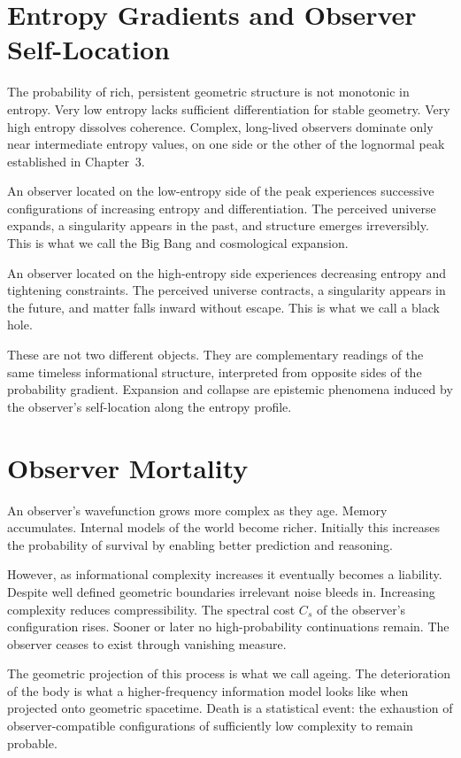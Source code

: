 \section{Entropy Gradients and Observer Self-Location}

The probability of rich, persistent geometric structure is not monotonic
in entropy. Very low entropy lacks sufficient differentiation for stable
geometry. Very high entropy dissolves coherence. Complex, long-lived
observers dominate only near intermediate entropy values, on one side or
the other of the lognormal peak established in Chapter~3.

An observer located on the low-entropy side of the peak experiences
successive configurations of increasing entropy and differentiation. The
perceived universe expands, a singularity appears in the past, and
structure emerges irreversibly. This is what we call the Big Bang and
cosmological expansion.

An observer located on the high-entropy side experiences decreasing
entropy and tightening constraints. The perceived universe contracts, a
singularity appears in the future, and matter falls inward without
escape. This is what we call a black hole.

These are not two different objects. They are complementary readings of
the same timeless informational structure, interpreted from opposite
sides of the probability gradient. Expansion and collapse are epistemic
phenomena induced by the observer's self-location along the entropy
profile.


\section{Observer Mortality}

An observer's wavefunction grows more complex as they age. Memory
accumulates. Internal models of the world become richer. Initially this
increases the probability of survival by enabling better prediction and
reasoning.

However, as informational complexity increases it eventually becomes a
liability. Despite well defined geometric boundaries irrelevant noise
bleeds in. Increasing complexity reduces compressibility. The spectral
cost $C_s$ of the observer's configuration rises. Sooner or later no
high-probability continuations remain. The observer ceases to exist
through vanishing measure.

The geometric projection of this process is what we call ageing. The
deterioration of the body is what a higher-frequency information model
looks like when projected onto geometric spacetime. Death is a
statistical event: the exhaustion of observer-compatible configurations
of sufficiently low complexity to remain probable.


